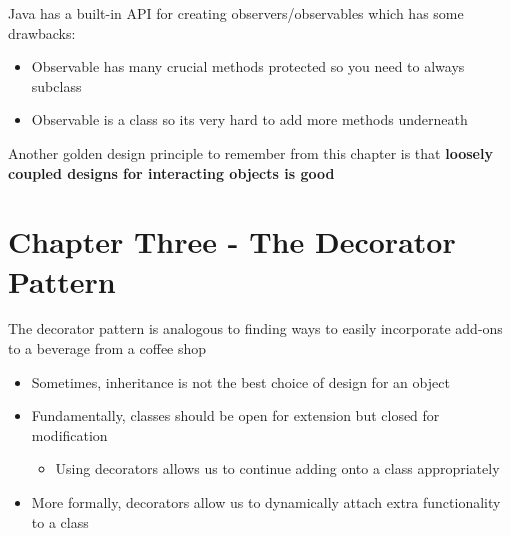 \documentclass{report}
\begin{document}
Java has a built-in API for creating observers/observables which has some drawbacks:

\begin{itemize}
  \item Observable has many crucial methods protected so you need to always subclass
  \item Observable is a class so its very hard to add more methods underneath
\end{itemize}

Another golden design principle to remember from this chapter is that \textbf{loosely coupled designs for interacting objects is good}

\section*{Chapter Three - The Decorator Pattern}

The decorator pattern is analogous to finding ways to easily incorporate add-ons to a beverage from a coffee shop

\begin{itemize}
  \item Sometimes, inheritance is not the best choice of design for an object
  \item Fundamentally, classes should be open for extension but closed for modification
  \begin{itemize}
    \item Using decorators allows us to continue adding onto a class appropriately
  \end{itemize}
  \item {More formally, decorators allow us to dynamically attach extra functionality to a class}
\end{itemize}
\end{document}
